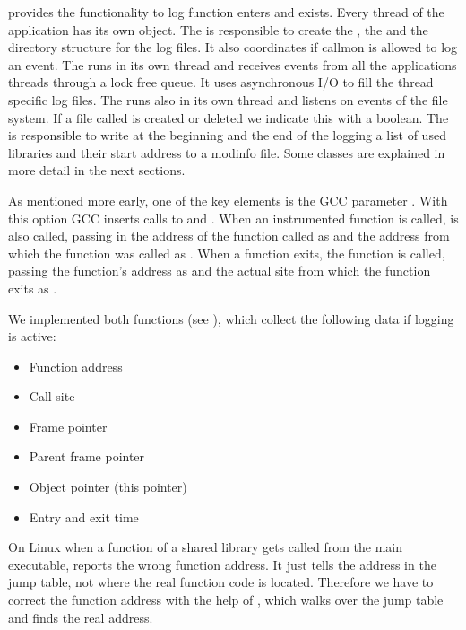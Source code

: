  provides the functionality to log function enters and exists. Every thread of the application has its own  object. The  is responsible to create the , the  and the directory structure for the log files. It also coordinates if callmon is allowed to log an event. The  runs in its own thread and receives events from all the applications threads through a lock free queue. It uses asynchronous I/O to fill the thread specific log files. The  runs also in its own thread and listens on events of the file system. If a file called  is created or deleted we indicate this with a boolean. The  is responsible to write at the beginning and the end of the logging a list of used libraries and their start address to a modinfo file. Some classes are explained in more detail in the next sections.

As mentioned more early, one of the key elements is the GCC parameter . With this option GCC inserts calls to  and . When an instrumented function is called,  is also called, passing in the address of the function called as  and the address from which the function was called as . When a function exits, the  function is called, passing the function's address as  and the actual site from which the function exits as .

We implemented both functions (see ), which collect the following data if logging is active:
\begin{itemize}
	\item Function address
	\item Call site
	\item Frame pointer
	\item Parent frame pointer
	\item Object pointer (this pointer)
	\item Entry and exit time
\end{itemize}

On Linux when a function of a shared library gets called from the main executable,  reports the wrong function address. It just tells the address in the jump table, not where the real function code is located. Therefore we have to correct the function address with the help of , which walks over the jump table and finds the real address.

